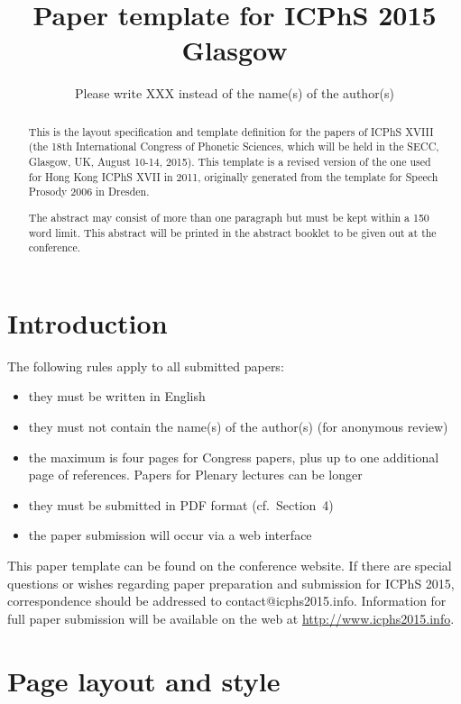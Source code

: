 \documentclass[a4paper,11pt,twocolumn]{article}
\title{Paper template for {ICPhS} 2015 Glasgow}
\author{Please write XXX instead of the name(s) of the author(s)}
\begin{document}
\maketitle

\begin{abstract}
This is the layout specification and template definition for the papers of ICPhS XVIII (the 18th International Congress of Phonetic Sciences, which will be held in the SECC, Glasgow, UK, August 10-14, 2015). This template is a revised version of the one used for Hong Kong ICPhS XVII in 2011, originally generated from the template for Speech Prosody 2006 in Dresden.

The abstract may consist of more than one paragraph but must be kept within a 150 word limit. This abstract will be printed in the abstract booklet to be given out at the conference.
\end{abstract}



\section{Introduction}

The following rules apply to all submitted papers:

\begin{itemize}
\item they must be written in English
\item they must not contain the name(s) of the author(s) (for
anonymous review)
\item the maximum is four pages for Congress papers, plus up to one additional page of references. Papers for Plenary lectures can be longer
\item they must be submitted in PDF format (cf.\ Section~4)
\item the paper submission will occur via a web interface
\end{itemize}

This paper template can be found on the conference website. If there
are special questions or wishes regarding paper preparation and
submission for ICPhS 2015, correspondence should be addressed to
contact@icphs2015.info.  Information for full paper submission will be
available on the web at \url{http://www.icphs2015.info}.



\section{Page layout and style}
\end{document}
